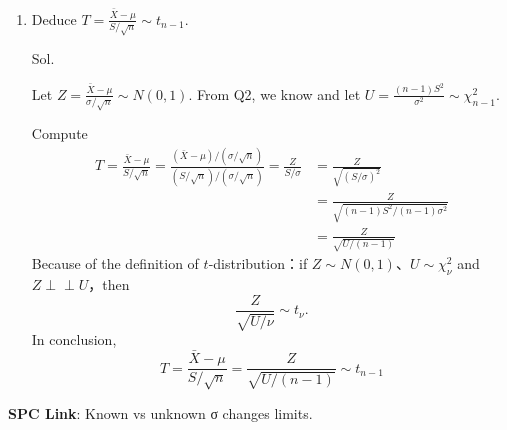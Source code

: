 \documentclass[a4paper, 12pt]{article}  %
\begin{document}
\begin{enumerate}
        Then divide by $\sigma^2$:
        $$\sum_{i=1}^n\left(\frac{X_i-\mu}{\sigma}\right)^2=\sum_{i=1}^n\left(\frac{X_i-\bar X}{\sigma}\right)^2+\left(\frac{\bar X-\mu}{\sigma /\sqrt n}\right)^2.$$
        Let
        $$U=\sum_{i=1}^n\left(\frac{X_i-\mu}{\sigma}\right)^2,　V=\sum_{i=1}^n\left(\frac{X_i-\bar X}{\sigma}\right)^2,　W=\left(\frac{\bar X-\mu}{\sigma /\sqrt n}\right)^2.$$
        Then $U=V+W$, and we can know
        $$U=\sum_{i=1}^n Z_i^2 \sim \chi^2_n,　V=\frac{1}{\sigma^2}\sum_{i=1}^n (X_i-\bar X)^2=\frac{(n-1)S^2}{\sigma^2},$$
        also $\bar X\sim N(\mu,\sigma^2/n)$, hence $$\frac{\bar X-\mu}{\sigma /\sqrt n}\sim N(0,1)\Rightarrow W\sim\chi^2_1.$$
        By (1) and $W$ is a function of $\bar X$ while
        $V=\frac{(n-1)S^2}{\sigma^2}$ is a function of $S^2$, we have $$V\perp \!\!\! \perp W.$$
        From $U=V+W$ and independence, we have $$M_U(t)=M_V(t)\,M_W(t).$$
        By (4), we have $$(1-2t)^{-n/2}=M_U(t)=M_V(t)\,(1-2t)^{-1/2}\Rightarrow M_V(t)=(1-2t)^{-(n-1)/2}.$$
        Since $M_V(t)$ is the mgf of $\chi^2_{n-1}$, finally, $$V=\frac{(n-1)S^2}{\sigma^2}\sim \chi^2_{n-1}.$$

        \item Deduce $T=\frac{\bar{X}-\mu}{S/\sqrt{n}} \sim t_{n-1}$.
        
        Sol.
        
        Let $Z=\frac{\bar X-\mu}{\sigma /\sqrt n}\sim N(0,1)$. From Q2, we know and let $U=\frac{(n-1)S^2}{\sigma^2}\sim \chi^2_{n-1}.$

        Compute
        \begin{align*}
        T=\frac{\bar X-\mu}{S/\sqrt n}=\frac{(\bar X-\mu)/(\sigma /\sqrt n)}{(S/\sqrt n)/(\sigma /\sqrt n)}=\frac{Z}{S/\sigma}
        &=\frac{Z}{\sqrt{(S/\sigma)^2}} \\
        &=\frac{Z}{\sqrt{(n-1)S^2/(n-1)\sigma^2}} \\
        &=\frac{Z}{\sqrt{U/(n-1)}}
        \end{align*}
        Because of the definition of $t$-distribution：if $Z\sim N(0,1)$、$U\sim\chi^2_\nu$ and $Z\perp \!\!\! \perp U$，then $$\frac{Z}{\sqrt{U/\nu}}\sim t_\nu.$$
        In conclusion, $$T=\frac{\bar X-\mu}{S/\sqrt n}=\frac{Z}{\sqrt{U/(n-1)}}\sim t_{n-1}$$

    \end{enumerate}

    \textbf{SPC Link}: Known vs unknown σ changes limits.
\end{document}
